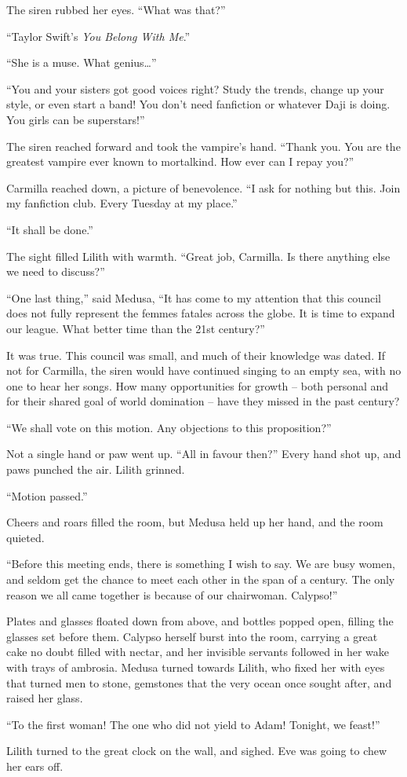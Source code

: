The siren rubbed her eyes. “What was that?”

“Taylor Swift’s \textit{You Belong With Me}.”

“She is a muse. What genius…”

“You and your sisters got good voices right? Study the trends, change up your style, or even start a band! You don’t need fanfiction or whatever Daji is doing. You girls can be superstars!”

The siren reached forward and took the vampire’s hand. “Thank you. You are the greatest vampire ever known to mortalkind. How ever can I repay you?”

Carmilla reached down, a picture of benevolence. “I ask for nothing but this. Join my fanfiction club. Every Tuesday at my place.”

“It shall be done.”

The sight filled Lilith with warmth. “Great job, Carmilla. Is there anything else we need to discuss?”

“One last thing,” said Medusa, “It has come to my attention that this council does not fully represent the femmes fatales across the globe. It is time to expand our league. What better time than the 21st century?”

It was true. This council was small, and much of their knowledge was dated. If not for Carmilla, the siren would have continued singing to an empty sea, with no one to hear her songs. How many opportunities for growth – both personal and for their shared goal of world domination – have they missed in the past century? 

“We shall vote on this motion. Any objections to this proposition?”

Not a single hand or paw went up. “All in favour then?” Every hand shot up, and paws punched the air. Lilith grinned.

“Motion passed.”

Cheers and roars filled the room, but Medusa held up her hand, and the room quieted. 

“Before this meeting ends, there is something I wish to say. We are busy women, and seldom get the chance to meet each other in the span of a century. The only reason we all came together is because of our chairwoman. Calypso!”

Plates and glasses floated down from above, and bottles popped open, filling the glasses set before them. Calypso herself burst into the room, carrying a great cake no doubt filled with nectar, and her invisible servants followed in her wake with trays of ambrosia. Medusa turned towards Lilith, who fixed her with eyes that turned men to stone, gemstones that the very ocean once sought after, and raised her glass.

“To the first woman! The one who did not yield to Adam! Tonight, we feast!”

Lilith turned to the great clock on the wall, and sighed. Eve was going to chew her ears off.